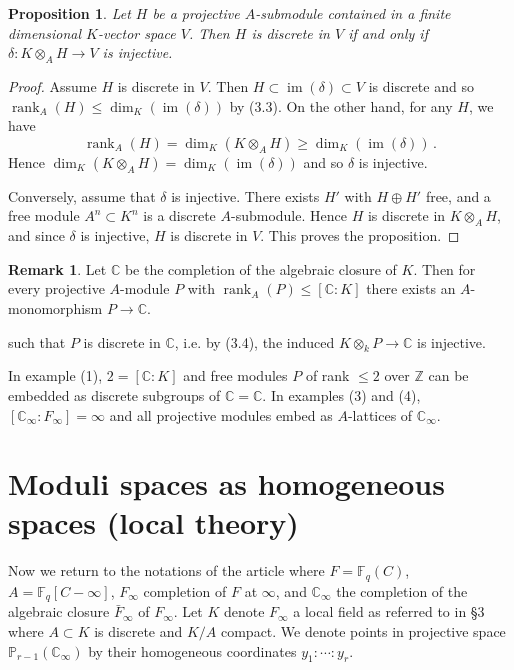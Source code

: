 \documentclass[12pt,a4paper]{article}
\theoremstyle{plain}
\newtheorem{proposition}{Proposition}[section]
\theoremstyle{definition}
\newtheorem{remark}{Remark}[section]
\theoremstyle{remark}
\DeclareMathOperator{\rank}{rank}
\DeclareMathOperator{\im}{im}
\begin{document}
\begin{proposition}
Let $H$ be a projective $A$-submodule contained in a finite dimensional 
$K$-vector space $V$. Then $H$ is discrete in $V$ if and only if 
$\delta\colon K \otimes_A H \to V$ is injective.
\end{proposition}

\begin{proof}
Assume $H$ is discrete in $V$. Then $H \subset \im(\delta) \subset V$ is 
discrete and so $\rank_A(H) \leqslant \dim_K(\im(\delta))$ by (3.3). On the 
other hand, for any $H$, we have
\[
\rank_A(H) = \dim_K(K \otimes_A H) \geqslant \dim_K(\im(\delta)) \,.
\]
Hence $\dim_K(K \otimes_A H) = \dim_K(\im(\delta))$ and so $\delta$ is 
injective.

Conversely, assume that $\delta$ is injective. There exists $H'$ with 
$H \oplus H'$ free, and a free module $A^n \subset K^n$ is a discrete 
$A$-submodule. Hence $H$ is discrete in $K \otimes_A H$, and since $\delta$ 
is injective, $H$ is discrete in $V$. This proves the proposition.
\end{proof}

\begin{remark}
Let $\mathbb{C}$ be the completion of the algebraic closure of $K$. Then for 
every projective $A$-module $P$ with $\rank_A(P) \leqslant [\mathbb{C} : K]$ 
there exists an $A$-monomorphism $P \to \mathbb{C}$.
\end{remark}

such that $P$ is discrete in $\mathbb{C}$, i.e. by (3.4), the induced 
$K \otimes_k P \to \mathbb{C}$ is injective.

In example (1), $2 = [\mathbb{C} : K]$ and free modules $P$ of rank 
$\leqslant 2$ over $\mathbb{Z}$ can be embedded as discrete subgroups of 
$\mathbb{C} = \mathbb{C}$. In examples (3) and (4), 
$[\mathbb{C}_\infty : F_\infty] = \infty$ and all projective modules embed as 
$A$-lattices of $\mathbb{C}_\infty$.


\section{Moduli spaces as homogeneous spaces (local theory)}

Now we return to the notations of the article where $F = \mathbb{F}_q(C)$, 
$A = \mathbb{F}_q[C - \infty]$, $F_\infty$ completion of $F$ at $\infty$, and 
$\mathbb{C}_\infty$ the completion of the algebraic closure $\bar{F}_\infty$ of 
$F_\infty$. Let $K$ denote $F_\infty$ a local field as referred to in \S 3 
where $A \subset K$ is discrete and $K/A$ compact. We denote points in 
projective space $\mathbb{P}_{r-1}(\mathbb{C}_\infty)$ by their homogeneous 
coordinates $y_1 : \cdots : y_r$.
\end{document}
